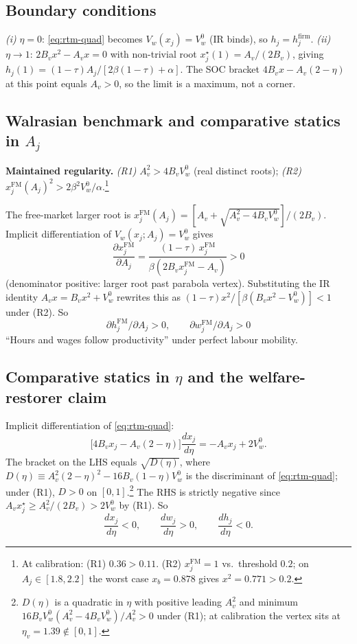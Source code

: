 \documentclass[a4paper,11pt]{article}
\begin{document}
\subsection{Boundary conditions}
\emph{(i)} $\eta\!=\!0$: \eqref{eq:rtm-quad} becomes $V_w(x_j)\!=\!V_w^{0}$ (IR binds), so $h_j\!=\!h^{\mathrm{firm}}_j$.
\emph{(ii)} $\eta\!\to\!1$: $2B_v x^{2}-A_v x=0$ with non-trivial root $x_j^{\star}(1)\!=\!A_v/(2B_v)$, giving $h_j(1)\!=\!(1-\tau)A_j/[2\beta(1-\tau)+\alpha]$. The SOC bracket $4B_v x-A_v(2-\eta)$ at this point equals $A_v\!>\!0$, so the limit is a maximum, not a corner.

\subsection{Walrasian benchmark and comparative statics in $A_j$}\label{app:q5-walras}
\textbf{Maintained regularity.} \emph{(R1)} $A_v^{2}\!>\!4B_vV_w^{0}$ (real distinct roots); \emph{(R2)} $x_j^{\mathrm{FM}}(A_j)^{2}>2\beta^{2}V_w^{0}/\alpha$.\footnote{At calibration: (R1) $0.36>0.11$. (R2) $x_j^{\mathrm{FM}}\!=\!1$ vs.\ threshold $0.2$; on $A_j\!\in\![1.8,2.2]$ the worst case $x_b\!=\!0.878$ gives $x^{2}\!=\!0.771>0.2$.}

The free-market larger root is $x_j^{\mathrm{FM}}(A_j)=[A_v+\sqrt{A_v^{2}-4B_v V_w^{0}}]/(2B_v)$. Implicit differentiation of $V_w(x_j;A_j)\!=\!V_w^{0}$ gives
\[
\frac{\partial x_j^{\mathrm{FM}}}{\partial A_j}=\frac{(1-\tau)\,x_j^{\mathrm{FM}}}{\beta(2B_v x_j^{\mathrm{FM}}-A_v)}>0
\]
(denominator positive: larger root past parabola vertex). Substituting the IR identity $A_v x\!=\!B_v x^{2}+V_w^{0}$ rewrites this as $(1-\tau)x^{2}/[\beta(B_v x^{2}-V_w^{0})]<1$ under (R2). So
\[
\partial h_j^{\mathrm{FM}}/\partial A_j>0,\qquad \partial w_j^{\mathrm{FM}}/\partial A_j>0
\]
``Hours and wages follow productivity'' under perfect labour mobility.

\subsection{Comparative statics in $\eta$ and the welfare-restorer claim}
Implicit differentiation of \eqref{eq:rtm-quad}:
\[
\bigl[4B_v x_j-A_v(2-\eta)\bigr]\frac{dx_j}{d\eta}=-A_v x_j+2V_w^{0}.
\]
The bracket on the LHS equals $\sqrt{D(\eta)}$, where $D(\eta)\!\equiv\!A_v^{2}(2-\eta)^{2}-16B_v(1-\eta)V_w^{0}$ is the discriminant of \eqref{eq:rtm-quad}; under (R1), $D>0$ on $[0,1]$.\footnote{$D(\eta)$ is a quadratic in $\eta$ with positive leading $A_v^{2}$ and minimum $16B_vV_w^{0}(A_v^{2}-4B_vV_w^{0})/A_v^{2}>0$ under (R1); at calibration the vertex sits at $\eta_v\!=\!1.39\!\notin\![0,1]$.} The RHS is strictly negative since $A_v x_j^{\star}\ge A_v^{2}/(2B_v)>2V_w^{0}$ by (R1). So
\[
\frac{dx_j}{d\eta}<0,\qquad \frac{dw_j}{d\eta}>0,\qquad \frac{dh_j}{d\eta}<0.
\]
\end{document}
